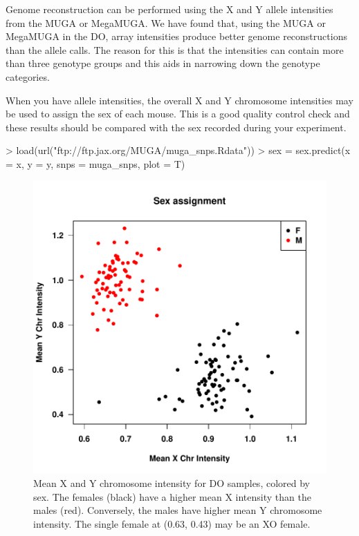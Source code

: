 \documentclass{article}
\begin{document}
Genome reconstruction can be performed using the X and Y allele intensities from the MUGA or 
MegaMUGA. We have found that, using the MUGA or MegaMUGA in the DO, array intensities produce 
better genome reconstructions than the allele calls. The reason for this is that the 
intensities can contain more than three genotype groups and this aids in narrowing down the 
genotype categories.

When you have allele intensities, the overall X and Y chromosome intensities may be used
to assign the sex of each mouse. This is a good quality control check and these results
should be compared with the sex recorded during your experiment.

\begin{Schunk}
\begin{Sinput}
> load(url("ftp://ftp.jax.org/MUGA/muga_snps.Rdata"))
> sex = sex.predict(x = x, y = y, snps = muga_snps, plot = T)
\end{Sinput}
\end{Schunk}

\begin{figure}
\begin{center}
\includegraphics{Genotyping_DO_Mice-fig1}
\end{center}
\caption{Mean X and Y chromosome intensity for DO samples, colored by sex. The females (black) have a higher mean X intensity than the males (red). Conversely, the males have higher mean Y chromosome intensity. The single female at (0.63, 0.43) may be an XO female. }
\label{fig:predict_sex}
\end{figure}
\end{document}

